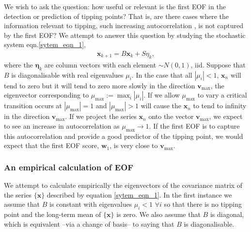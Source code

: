 \documentclass[11pt,a4paper,reqno]{article}
\numberwithin{equation}{section}
\newcommand{\x}{{\mathbf x}}
\newcommand{\etab}{{\mathbf \eta}}
\begin{document}
We wish to ask the question: how useful or relevant is the first EOF in the detection or prediction of tipping points? That is, are there cases where the information relevant to tipping, such increasing autocorrelation \cite{scheffer2009}, is not captured by the first EOF? We attempt to answer this question by studying the stochastic system eqn.\ref{sytem_eqn_1},
\begin{align}
\x_{k+1} = B\x_k + S\eta_k,
\label{sytem_eqn_1}
\end{align}
where the $\etab_k$ are column vectors with each element $\sim N(0,1)$, iid. Suppose that $B$ is diagonalisable with real eigenvalues $\mu_{i}$. In the case that all $|\mu_{i}|<1$, $\x_n$ will tend to zero but it will tend to zero more slowly in the direction $\mathbf{v}_{\max}$, the eigenvector corresponding to $\mu_{\max} := \max_{i}|\mu_{i}|$. If we allow $\mu_{\max}$ to vary a critical transition occurs at $|\mu_{\max}|=1$ and $|\mu_{\max}|>1$ will cause the $\x_n$ to tend to infinity in the direction $\mathbf{v}_{\max}$. If we project the series $\x_n$ onto the vector $\mathbf{v}_{\max}$, we expect to see an increase in autocorrelation as $\mu_{\max} \rightarrow 1$. If the first EOF is to capture this autocorrelation and provide a good predictor of the tipping point, we would expect that the first EOF score, $\mathbf{w}_1$, is very close to $\mathbf{v}_{\max}$. \\

\subsubsection{An empirical calculation of EOF}
We attempt to calculate empirically the eigenvectors of the covariance matrix of the series $\{\x\}$ described by equation \ref{sytem_eqn_1}. In the first instance we assume that $B$ is constant with eigenvalues $\mu_i<1$ $\forall i$ so that there is no tipping point and the long-term mean of $\{\x\}$ is zero. We also assume that $B$ is diagonal, which is equivalent --via a change of basis-- to saying that $B$ is diagonalisable. \\
\end{document}
